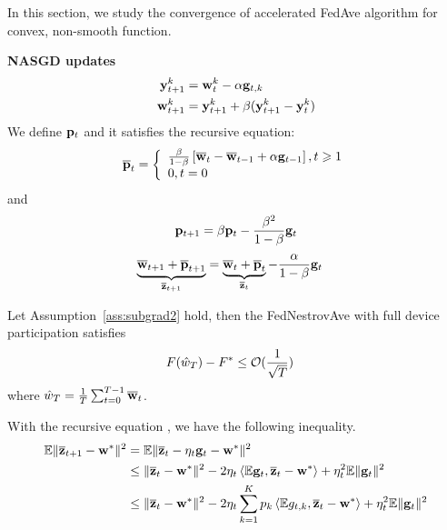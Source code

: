 
In this section, we study the convergence of accelerated FedAve 
algorithm for convex, non-smooth function.

\textbf{NASGD updates}
\begin{align}
	{\mathbf{y}}^k_{t+1} &= {\mathbf{w}}^k_{t} - \alpha  {\mathbf{g}}_{t,k}	\\
	{\mathbf{w}}^k_{t+1} & = {\mathbf{y}}^k_{t+1} + \beta({\mathbf{y}}^k_{t+1} - {\mathbf{y}}^k_{t})
\end{align}
We define ${\mathbf{p}}_t$ and it satisfies the recursive equation:
\begin{align}
	{\overline{\mathbf{p}}}_{t}=\left\{\begin{array}{l}\frac{\beta}{1-\beta}\left[{\overline{\mathbf{w}}}_{t}-{\overline{\mathbf{w}}}_{t-1}+\alpha {\mathbf{g}}_{t-1}\right], t \geqslant 1 \\ 0, t=0\end{array}\right.
\end{align}
and 
\begin{align}
	{\mathbf{p}}_{t+1} =  \beta {\mathbf{p}}_t - \frac{\beta^2}{1 - \beta} {\mathbf{g}}_t
	\label{eq:recursivep}
\end{align}
\begin{align}
	\underbrace{\overline{{\mathbf{w}}}_{t+1} + \overline{{\mathbf{p}}}_{t+1}}_{\overline{{\mathbf{z}}}_{t+1}} &= \underbrace{\overline{{\mathbf{w}}}_{t} + \overline{{\mathbf{p}}}_{t}}_{\overline{{\mathbf{z}}}_{t}} - \frac{\alpha}{1- \beta} {\mathbf{g}}_t
	\label{eq:nasgdzt}
\end{align}


\begin{theorem}
	Let Assumption~\ref{ass:subgrad2} hold, 
	then the FedNestrovAve with full device participation satisfies
	\begin{align}
		 F(\hat{w}_T) - F^* &\leq {\mathcal{O}}(\frac{1}{\sqrt{T} })
	\end{align}
	where $\hat{w}_T = \frac{1}{T}\sum_{t=0}^{T-1} {\overline{\mathbf{w}}}_t$.
	\label{th:nasgcvxnonsmoth}
\end{theorem}

With the recursive equation \eq{\ref{eq:nasgdzt}}, we have the following 
inequality.
\begin{align}
	\mathbb{E}\|\overline{{\mathbf{z}}}_{t+1} - {\mathbf{w}}^* \|^2  &= \mathbb{E}\|\overline{{\mathbf{z}}}_{t} - \eta_t{\mathbf{g}}_t - {\mathbf{w}}^* \|^2 \\
& \leq  \| \overline{{\mathbf{z}}}_{t} - {\mathbf{w}}^*\|^2  - 2\eta_t\left<\mathbb{E}{\mathbf{g}}_t, \overline{{\mathbf{z}}}_{t} - {\mathbf{w}}^*\right> +  \eta_t^2\mathbb{E}\|{\mathbf{g}}_t\|^2 \\
& \leq  \| \overline{{\mathbf{z}}}_{t} - {\mathbf{w}}^*\|^2  - 2\eta_t\sum_{k=1}^K p_k\left<\mathbb{E} g_{t,k}, \overline{{\mathbf{z}}}_{t} - {\mathbf{w}}^*\right> +  \eta_t^2\mathbb{E}\|{\mathbf{g}}_t\|^2 \label{eq:nagcvx1}
\end{align}

